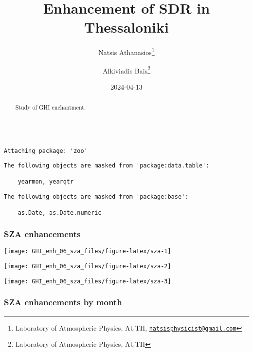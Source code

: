 \documentclass[
  10pt,
  a4paper,oneside]{article}
\title{Enhancement of SDR in Thessaloniki}
\author{Natsis Athanasios\footnote{Laboratory of Atmospheric Physics, AUTH, \href{mailto:natsisphysicist@gmail.com}{\nolinkurl{natsisphysicist@gmail.com}}} \and Alkiviadis Bais\footnote{Laboratory of Atmospheric Physics, AUTH}}
\date{2024-04-13}
\begin{document}
\maketitle
\begin{abstract}
Study of GHI enchantment.
\end{abstract}

{
\hypersetup{linkcolor=}
\setcounter{tocdepth}{4}
\tableofcontents
}
\begin{verbatim}

Attaching package: 'zoo'
\end{verbatim}

\begin{verbatim}
The following objects are masked from 'package:data.table':

    yearmon, yearqtr
\end{verbatim}

\begin{verbatim}
The following objects are masked from 'package:base':

    as.Date, as.Date.numeric
\end{verbatim}

\newpage
\FloatBarrier

\hypertarget{sza-enhancements}{%
\subsubsection{SZA enhancements}\label{sza-enhancements}}

\begin{center}\texttt{[image: GHI\_enh\_06\_sza\_files/figure-latex/sza-1]} \end{center}

\begin{center}\texttt{[image: GHI\_enh\_06\_sza\_files/figure-latex/sza-2]} \end{center}

\begin{center}\texttt{[image: GHI\_enh\_06\_sza\_files/figure-latex/sza-3]} \end{center}

\newpage
\FloatBarrier

\hypertarget{sza-enhancements-by-month}{%
\subsubsection{SZA enhancements by month}\label{sza-enhancements-by-month}}
\end{document}
